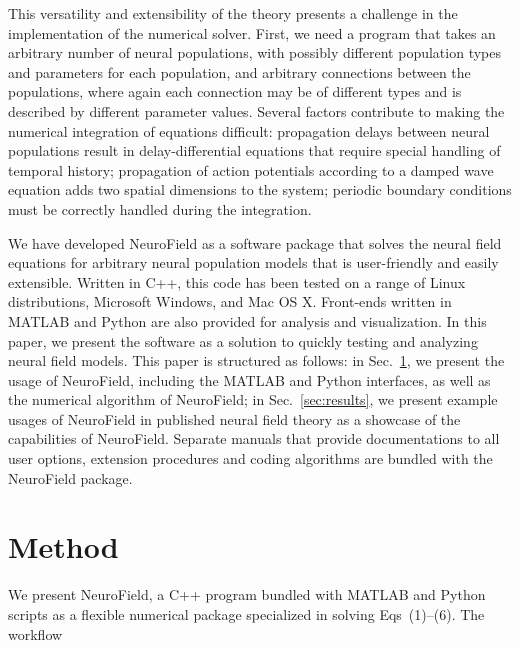 \documentclass[preprint,review,10pt,authoryear,letterpaper]{elsarticle}
\begin{document}
This versatility and extensibility of the theory presents a challenge in the implementation of the numerical solver. First, we need a program that takes an arbitrary number of neural populations, with possibly different population types and parameters for each population, and arbitrary connections between the populations, where again each connection may be of different types and is described by different parameter values. Several factors contribute to making the numerical integration of equations difficult: propagation delays between neural populations result in delay-differential equations that require special handling of temporal history; propagation of action potentials according to a damped wave equation adds two spatial dimensions to the system; periodic boundary conditions must be correctly handled during the integration. 

We have developed NeuroField as a software package that solves the neural field equations for arbitrary neural population models that is user-friendly and easily extensible. Written in C++, this code has been tested on a range of Linux distributions, Microsoft Windows, and Mac OS X. Front-ends written in MATLAB and Python are also provided for analysis and visualization. In this paper, we present the software as a solution to quickly testing and analyzing neural field models. This paper is structured as follows: in Sec.~\ref{sec:method}, we present the usage of NeuroField, including the MATLAB and Python interfaces, as well as the numerical algorithm of NeuroField; in Sec.~\ref{sec:results}, we present example usages of NeuroField in published neural field theory as a showcase of the capabilities of NeuroField. Separate manuals that provide documentations to all user options, extension procedures and coding algorithms are bundled with the NeuroField package.

\section{Method}
\label{sec:method}

We present NeuroField, a C++ program bundled with MATLAB and Python scripts as a flexible numerical package specialized in solving Eqs~(1)--(6). The workflow 
\end{document}
